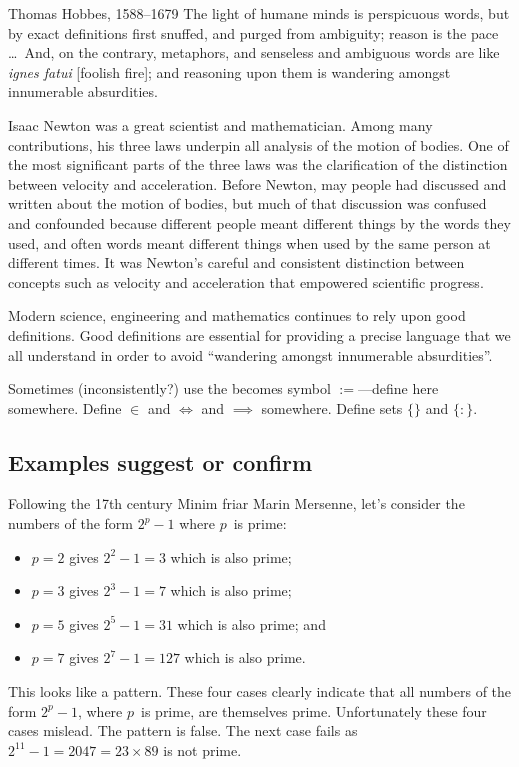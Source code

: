 \begin{draft}
\begin{quoted}{Thomas Hobbes, 1588--1679}
The light of humane minds is perspicuous words, but by exact definitions first snuffed, and purged from ambiguity; reason is the pace \ldots\ And, on the contrary, metaphors, and senseless and ambiguous words are like \emph{ignes fatui} [foolish fire]; and reasoning upon them is wandering amongst innumerable absurdities.
\end{quoted}

Isaac Newton was a great scientist and mathematician.
Among many contributions, his three laws underpin all analysis of the motion of bodies.
One of the most significant parts of the three laws was the clarification of the distinction between velocity and acceleration.
Before Newton, may people had discussed and written about the motion of bodies, but much of that discussion was confused and confounded because different people meant different things by the words they used, and often words meant different things when used by the same person at different times.
It was Newton's careful and consistent distinction between concepts such as velocity and acceleration that empowered scientific progress.

Modern science, engineering and mathematics continues to rely upon good definitions.
Good definitions are essential for providing a precise language that we all understand in order to avoid ``wandering amongst innumerable absurdities''.


Sometimes (inconsistently?) use the becomes symbol \(:=\)---define here somewhere.  Define \(\in\) and \(\iff\) and \(\implies\) somewhere.  Define sets \(\{\}\) and \(\{:\}\).




\subsection{Examples suggest or confirm}
\label{sec:egsc}

\begin{example}
Following the 17th century Minim friar Marin Mersenne, let's consider the numbers of the form \(2^p-1\) where \(p\)~is prime:
\begin{itemize}
\item \(p=2\) gives \(2^2-1=3\) which is also prime;
\item \(p=3\) gives \(2^3-1=7\) which is also prime;
\item \(p=5\) gives \(2^5-1=31\) which is also prime; and
\item \(p=7\) gives \(2^7-1=127\) which is also prime.
\end{itemize}
This looks like a pattern.
These four cases clearly indicate that all numbers of the form \(2^p-1\), where \(p\)~is prime, are themselves prime.
Unfortunately these four cases mislead. 
The pattern is false.
The next case fails as \(2^{11}-1= 2047 =23\times 89\) is not prime.
\end{example}


\end{draft}
